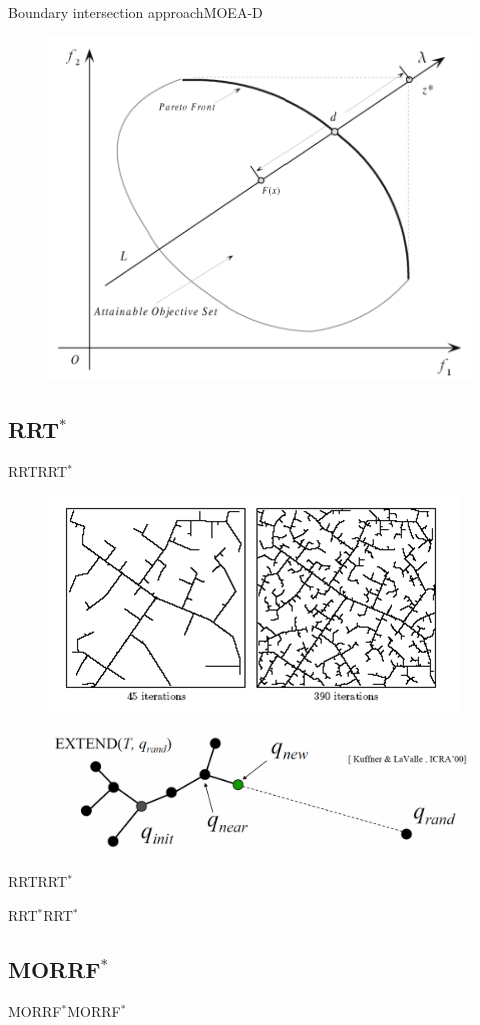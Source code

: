 \begin{frame}{Boundary intersection approach}{MOEA-D}
	\begin{figure}
		\centering
		\includegraphics[width=.6\linewidth]{figure/boundary_intersection}
		\label{fig:boundary_intersection}
	\end{figure}	
\end{frame}

\subsection{RRT$^{*}$}

\begin{frame}{RRT}{RRT$^{*}$}
	\begin{figure}
		\centering
		\includegraphics[width=.5\linewidth]{figure/RRT_graph1}
		\label{fig:rrt}
	\end{figure}
	\begin{figure}
		\centering
		\includegraphics[width=.9\linewidth]{figure/rrt_extend}
		\label{fig:rrt_extend}
	\end{figure}
\end{frame}

\begin{frame}{RRT}{RRT$^{*}$}

\end{frame}


\begin{frame}{RRT$^{*}$}{RRT$^{*}$}
	
\end{frame}

\subsection{MORRF$^{*}$}

\begin{frame}{MORRF$^{*}$}{MORRF$^{*}$}
	
\end{frame}